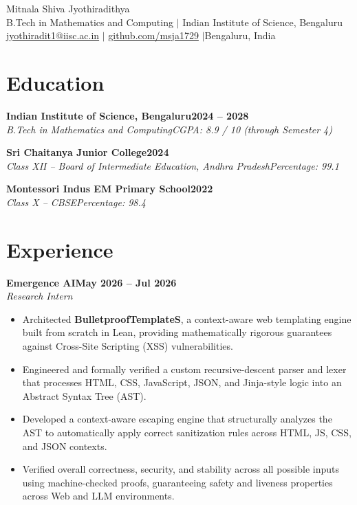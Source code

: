 \documentclass[10pt,a4paper]{article}
\newcommand{\entry}[4]{%
  \textbf{#1}\hfill\textbf{#2}\\
  {\small\textit{#3}}\hfill{\small\textit{#4}}\par}
\begin{document}
\begin{center}
  {\fontsize{24}{28}\selectfont Mitnala Shiva Jyothiradithya}\\[0.5em]
  B.Tech in Mathematics and Computing $|$ Indian Institute of Science, Bengaluru\\[0.2em]
  {\small \href{mailto:jyothiradit1@iisc.ac.in}{jyothiradit1@iisc.ac.in} \quad$|$\quad
  \href{https://github.com/msja1729}{github.com/msja1729} \quad$|$\quad Bengaluru, India}
\end{center}

\section*{Education}
\entry{Indian Institute of Science, Bengaluru}{2024 -- 2028}{B.Tech in Mathematics and Computing}{CGPA: 8.9 / 10 (through Semester 4)}
\entry{Sri Chaitanya Junior College}{2024}{Class XII -- Board of Intermediate Education, Andhra Pradesh}{Percentage: 99.1}
\entry{Montessori Indus EM Primary School}{2022}{Class X -- CBSE}{Percentage: 98.4}

\section*{Experience}
\entry{Emergence AI}{May 2026 -- Jul 2026}{Research Intern}{}
\begin{itemize}
  \item Architected \textbf{BulletproofTemplateS}, a context-aware web templating engine built from scratch in Lean, providing mathematically rigorous guarantees against Cross-Site Scripting (XSS) vulnerabilities.
  \item Engineered and formally verified a custom recursive-descent parser and lexer that processes HTML, CSS, JavaScript, JSON, and Jinja-style logic into an Abstract Syntax Tree (AST).
  \item Developed a context-aware escaping engine that structurally analyzes the AST to automatically apply correct sanitization rules across HTML, JS, CSS, and JSON contexts.
  \item Verified overall correctness, security, and stability across all possible inputs using machine-checked proofs, guaranteeing safety and liveness properties across Web and LLM environments.
\end{itemize}
\end{document}
